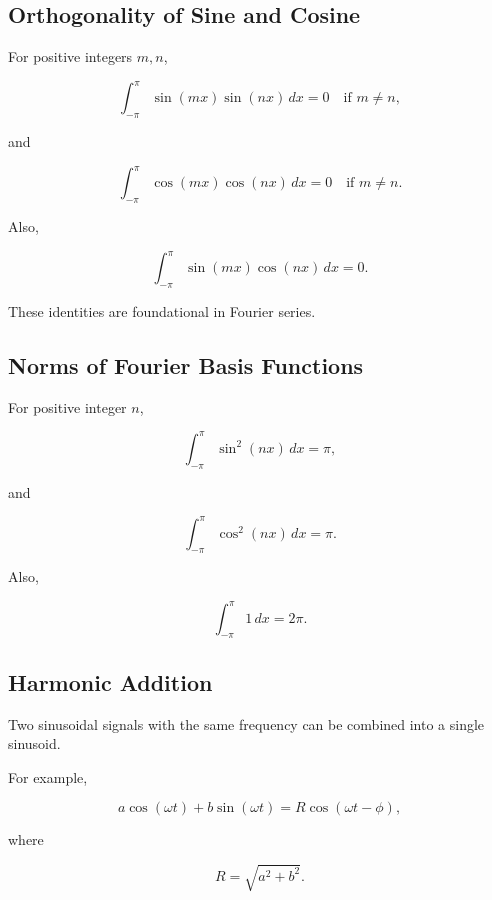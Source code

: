 \subsection{Orthogonality of Sine and Cosine}
\label{subsec:sine-cosine-orthogonality}

For positive integers \(m,n\),

\[
\boxed{
\int_{-\pi}^{\pi}
\sin(mx)\sin(nx)\,dx
=
0
\quad
\text{if }m\neq n,
}
\]

and

\[
\boxed{
\int_{-\pi}^{\pi}
\cos(mx)\cos(nx)\,dx
=
0
\quad
\text{if }m\neq n.
}
\]

Also,

\[
\boxed{
\int_{-\pi}^{\pi}
\sin(mx)\cos(nx)\,dx
=
0.
}
\]

These identities are foundational in Fourier series.

\subsection{Norms of Fourier Basis Functions}
\label{subsec:fourier-basis-norms}

For positive integer \(n\),

\[
\boxed{
\int_{-\pi}^{\pi}
\sin^2(nx)\,dx
=
\pi,
}
\]

and

\[
\boxed{
\int_{-\pi}^{\pi}
\cos^2(nx)\,dx
=
\pi.
}
\]

Also,

\[
\boxed{
\int_{-\pi}^{\pi}1\,dx
=
2\pi.
}
\]

\subsection{Harmonic Addition}
\label{subsec:harmonic-addition-reference}

Two sinusoidal signals with the same frequency can be combined into a single
sinusoid.

For example,

\[
a\cos(\omega t)
+
b\sin(\omega t)
=
R
\cos(\omega t-\phi),
\]

where

\[
\boxed{
R
=
\sqrt{a^2+b^2}.
}
\]

